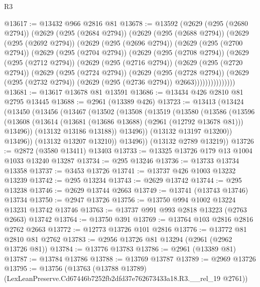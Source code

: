 \begin{lexlean}{R3}
\begin{coremodule}
@13617 := @13432 @966 @2816 @81
@13678 := @13592
    (@2629
      (@295 (@2680 @2794))
      (@2629
        (@295 (@2684 @2794))
        (@2629
          (@295 (@2688 @2794))
          (@2629
            (@295 (@2692 @2794))
            (@2629
              (@295 (@2696 @2794))
              (@2629
                (@295 (@2700 @2794))
                (@2629
                  (@295 (@2704 @2794))
                  (@2629
                    (@295 (@2708 @2794))
                    (@2629
                      (@295 (@2712 @2794))
                      (@2629
                        (@295 (@2716 @2794))
                        (@2629
                          (@295 (@2720 @2794))
                          (@2629
                            (@295 (@2724 @2794))
                            (@2629
                              (@295 (@2728 @2794))
                              (@2629
                                (@295 (@2732 @2794))
                                (@2629 (@295 (@2736 @2794)) @2663)))))))))))))))
@13681 := @13617 @13678 @81 @13591
@13686 := @13434 @426 @2810 @81 @2795 @13445
@13688 := @2961 (@13389 @426)
@13723 := @13413
    (@13424
      (@13450
        (@13456
          (@13467
            (@13502
              (@13508
                (@13519
                  (@13580
                    (@13586
                      (@13596
                        (@13608
                          (@13614 (@13681 (@13686 @13688) (@2961 (@12792 @13678 @81))) @13496))
                        (@13132 @13186 @13188))
                      @13496))
                  (@13132 @13197 @13200))
                @13496))
            (@13132 @13207 @13210))
          @13496))
      (@13132 @2789 @13219))
@13726 := @2872 (@3580 @13411) @13403
@13733 := @13325 @13726 @179 @13 @1004 @1033 @13240 @13287
@13734 := @295 @13246
@13736 := @13733 @13734 @13358
@13737 := @3453 @13726
@13741 := @13737 @426 @1003 @13232 @13239
@13742 := @295 @13234
@13743 := @2629 @13742
@13744 := @295 @13238
@13746 := @2629 @13744 @2663
@13749 := @13741 (@13743 @13746) @13734
@13750 := @2947 @13726
@13756 := @13750 @994 @1002 @13224 @13231 @13742 @13746
@13763 := @13737 @991 @993 @2818 @13223 (@2763 @2663) @13742
@13764 := @13750 @391
@13769 := @13764 @103 @2816 @2816 @2762 @2663
@13772 := @12773 @13726 @101 @2816
@13776 := @13772 @81 @2810 @81 @2762
@13783 := @2956 @13726 @81 @13294 (@2961 (@2962 @13726 @81))
@13784 := @13776 @13783
@13786 := @2961 (@13389 @81)
@13787 := @13784 @13786
@13788 := @13769 @13787
@13789 := @2969 @13726
@13795 := @13756
    (@13763 (@13788 @13789) (LexLeanPreserve.Cd67446b7252fb2dfd37e762673433a18.R3.__rel_19 @2761))

\end{coremodule}
\end{lexlean}
